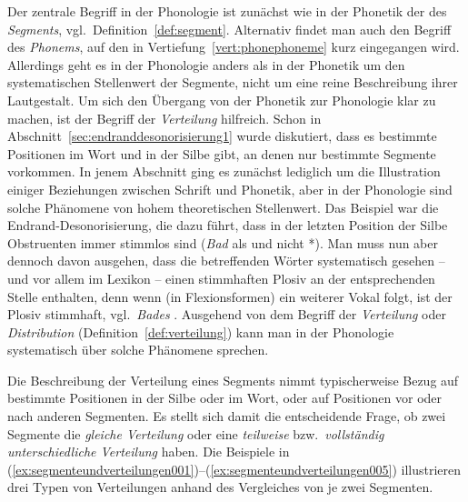 Der zentrale Begriff in der Phonologie ist zunächst wie in der Phonetik der des \textit{Segments}, vgl.\ Definition~\ref{def:segment}.
Alternativ findet man auch den Begriff des \textit{Phonems}, auf den in Vertiefung~\ref{vert:phonephoneme} kurz eingegangen wird.
Allerdings geht es in der Phonologie anders als in der Phonetik um den systematischen Stellenwert der Segmente, nicht um eine reine Beschreibung ihrer Lautgestalt.
Um sich den Übergang von der Phonetik zur Phonologie klar zu machen, ist der Begriff der \textit{Verteilung} hilfreich.
Schon in Abschnitt~\ref{sec:endranddesonorisierung1} wurde diskutiert, dass es bestimmte Positionen im Wort und in der Silbe gibt, an denen nur bestimmte Segmente vorkommen.
In jenem Abschnitt ging es zunächst lediglich um die Illustration einiger Beziehungen zwischen Schrift und Phonetik, aber in der Phonologie sind solche Phänomene von hohem theoretischen Stellenwert.
Das Beispiel war die Endrand-Desonorisierung, die dazu führt, dass in der letzten Position der Silbe Obstruenten immer stimmlos sind (\textit{Bad} als \textipa{[ba:t]} und nicht *\textipa{[ba:d]}).
Man muss nun aber dennoch davon ausgehen, dass die betreffenden Wörter systematisch gesehen -- und vor allem im Lexikon -- einen stimmhaften Plosiv an der entsprechenden Stelle enthalten, denn wenn (\zB in Flexionsformen) ein weiterer Vokal folgt, ist der Plosiv stimmhaft, vgl.\ \textit{Bades} .
Ausgehend von dem Begriff der \textit{Verteilung} oder \textit{Distribution} (Definition~\ref{def:verteilung}) kann man in der Phonologie systematisch über solche Phänomene sprechen.


Die Beschreibung der Verteilung eines Segments nimmt typischerweise Bezug auf bestimmte Positionen in der Silbe oder im Wort, oder auf Positionen vor oder nach anderen Segmenten.
Es stellt sich damit die entscheidende Frage, ob zwei Segmente die \textit{gleiche Verteilung} oder eine \textit{teilweise} bzw.\ \textit{vollständig unterschiedliche Verteilung} haben.
Die Beispiele in (\ref{ex:segmenteundverteilungen001})--(\ref{ex:segmenteundverteilungen005}) illustrieren drei Typen von Verteilungen anhand des Vergleiches von je zwei Segmenten.

